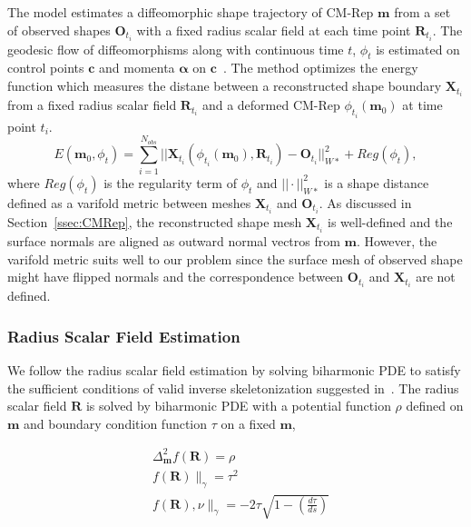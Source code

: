\documentclass[runningheads,a4paper]{llncs}
\begin{document}
The model estimates a diffeomorphic shape  trajectory of CM-Rep $\mathbf{m}$ from a set of observed shapes $\mathbf{O}_{t_i}$ with a fixed radius scalar field at each time point $\mathbf{R}_{t_i}$.
The geodesic flow of diffeomorphisms along with continuous time $t$, $\phi_t$ is estimated on control points $\mathbf{c}$ and momenta $\mathbf{\alpha}$ on $\mathbf{c}$~\cite{Fishbaugh2013}.
The method optimizes the energy function which measures the distane between a reconstructed shape boundary $\mathbf{X}_{t_i}$ from a fixed radius scalar field $\mathbf{R}_{t_i}$ and a deformed CM-Rep  $\phi_{t_i}( \mathbf{m}_0 )$ at time point $t_i$. 
\begin{equation}
 E( \mathbf{m}_0, \phi_t ) = \sum_{i=1}^{N_{obs}} || \mathbf{X}_{t_i} ( \phi_{t_i} (\mathbf{m}_0), \mathbf{R}_{t_i} ) - \mathbf{O}_{t_i} ||^2_{\mathit{W}*} + Reg( \phi_t ),
\end{equation}
where $Reg(\phi_t)$ is the regularity term of $\phi_t$ and $||\cdot||_{\mathit{W}*}^2$ is a shape distance defined as a varifold metric between meshes $\mathbf{X}_{t_i}$ and $\mathbf{O}_{t_i}$.
As discussed in Section~\ref{ssec:CMRep}, the reconstructed shape mesh $\mathbf{X}_{t_i}$ is well-defined and the surface normals are aligned as outward normal vectros from $\mathbf{m}$. 
However, the varifold metric suits well to our problem since the surface mesh of observed shape might have flipped normals and the correspondence between $\mathbf{O}_{t_i}$ and $\mathbf{X}_{t_i}$ are not defined. 

\subsubsection{Radius Scalar Field Estimation}
\label{sssec:RadUpdate}

We follow the radius scalar field estimation by solving biharmonic PDE to satisfy the sufficient conditions of valid inverse skeletonization suggested in~\cite{Yushkevich2009}.
The radius scalar field $\mathbf{R}$ is solved by biharmonic PDE with a potential function $\rho$ defined on $\mathbf{m}$ and boundary condition function $\tau$ on a fixed $\mathbf{m}$,

\begin{align}
 &\Delta_{\mathbf{m}}^2 f(\mathbf{R}) = \rho \\
 &f(\mathbf{R}) \|_{\gamma} = \tau^2 \\
 &f(\mathbf{R}), \nu \|_\gamma = -2 \tau \sqrt{ 1 - ( \frac{d\tau}{ds} ) } 
\label{eq:BiPDE}
\end{align}
\end{document}

